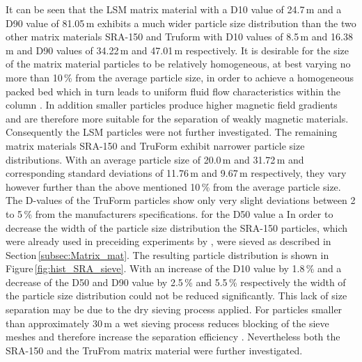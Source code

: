 It can be seen that the LSM matrix material with a D10 value of 24.7\,\textmu m and a D90 value of 81.05\,\textmu m exhibits a much wider particle size distribution than the two other matrix materials SRA-150 and Truform with D10 values of  8.5\,\textmu m and 16.38\,\textmu m and D90 values of 34.22\,\textmu m and 47.01\,\textmu m respectively. It is desirable for the size of the matrix material particles to be relatively homogeneous, at best varying no more than 10\,\% from the average particle size, in order to achieve a homogeneous packed bed which in turn leads to uniform fluid flow characteristics within the column \cite{miltenyi1997magnetic}. In addition smaller particles produce higher magnetic field gradients and are therefore more suitable for the separation of weakly magnetic materials. Consequently the LSM particles were not further investigated. The remaining matrix materials SRA-150 and TruForm exhibit narrower particle size distributions. With an average particle size of 20.0\,\textmu m and  31.72\,\textmu m and corresponding standard deviations of 11.76\,\textmu m and 9.67\,\textmu m respectively, they vary however further than the above mentioned 10\,\% from the average particle size. The D-values of the TruForm particles show only very slight deviations between 2 to 5\,\% from the manufacturers specifications. for the D50 value  a  In order to decrease the width of the particle size distribution the SRA-150 particles, which were already used in preceiding experiments by \cite{AndreMaster}, were sieved as described in Section\,\ref{subsec:Matrix_mat}. The resulting particle distribution is shown in Figure\,\ref{fig:hist_SRA_sieve}. With an increase of the D10 value by 1.8\,\% and a decrease of the D50 and D90 value by 2.5\,\% and 5.5\,\%  respectively the width of the particle size distribution could not be reduced significantly. This lack of size separation may be due to the dry sieving process applied. For particles smaller than approximately 30\,\textmu m a wet sieving process reduces blocking of the sieve meshes and therefore increase the separation efficiency \cite{RetschSieve}. Nevertheless both the SRA-150 and the TruFrom matrix material were further investigated. 

